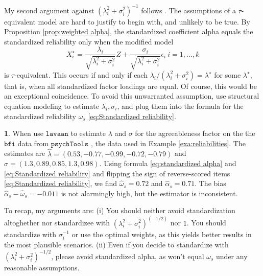 \documentclass{article}
\theoremstyle{plain}
\theoremstyle{plain}
\theoremstyle{definition}
\theoremstyle{remark}
\theoremstyle{definition}
\newtheorem{example}[thm]{\protect\examplename}
\theoremstyle{plain}
\theoremstyle{plain}
\theoremstyle{definition}
\providecommand{\examplename}{Example}
\begin{document}
My second argument against $(\lambda_{i}^{2}+\sigma_{i}^{2})^{-1}$
follows \citep{Falk2011-ae}. The assumptions of a $\tau$-equivalent model are hard
to justify to begin with, and unlikely to be true. By Proposition \ref{prop:weighted alpha}, the standardized coefficient alpha equals the standardized reliability only when the modified model
\[
X_{i}^{\star}=\frac{\lambda_{i}}{\sqrt{\lambda_{i}^{2}+\sigma_{i}^{2}}}Z+\frac{\sigma_{i}}{\sqrt{\lambda_{i}^{2}+\sigma_{i}^{2}}}\epsilon_{i}\:i=1,\ldots,k
\]
is $\tau$-equivalent. This occurs if and only if each $\lambda_{i}/(\lambda_{i}^{2}+\sigma_{i}^{2})=\lambda^{\star}$
for some $\lambda^{\star}$, that is, when all standardized factor loadings are equal. Of course, this would be an exceptional coincidence. To avoid this unwarranted assumption, use structural equation modeling to estimate $\lambda_{i},\sigma_{i}$, and plug them into
the formula for the standardized reliability $\omega_s$ \eqref{eq:Standardized reliability}. 

\begin{example}

When use $\mathtt{lavaan}$ to estimate $\lambda$ and $\sigma$ for the agreeableness factor on the the $\texttt{bfi}$ data from $\texttt{psychTools}$ \citep{Revelle2019-te}, the data used in Example \ref{exa:reliabilities}. The estimates are $\hat{\lambda} = (0.53, -0.77, -0.99, -0.72, -0.79)$ and $\hat{\sigma} = (1.3, 0.89, 0.85, 1.3, 0.98)$. Using formula \eqref{eq:standardized alpha} and \eqref{eq:Standardized reliability} and flipping the sign of reverse-scored items \eqref{eq:Standardized reliability}, we find $\hat{\omega}_s = 0.72$ and $\hat{\alpha}_s = 0.71$. The bias $\hat{\alpha}_s - \hat{\omega}_s = -0.011$ is not alarmingly high, but the estimator is inconsistent. 
\end{example}

To recap, my arguments are: (i) You should neither avoid standardization altoghether nor standardizee with $(\lambda_{i}^{2}+\sigma_{i}^{2})^(-1/2)$ nor $1$. You should standardize with $\sigma_i^{-1}$ or use the optimal weights, as this yields better results in the most plausible scenarios. (ii) Even if you decide to standardize with $(\lambda_{i}^{2}+\sigma_{i}^{2})^{-1/2}$, please avoid standardized alpha, as won't equal $\omega_s$ under any reasonable assumptions.

\end{document}
